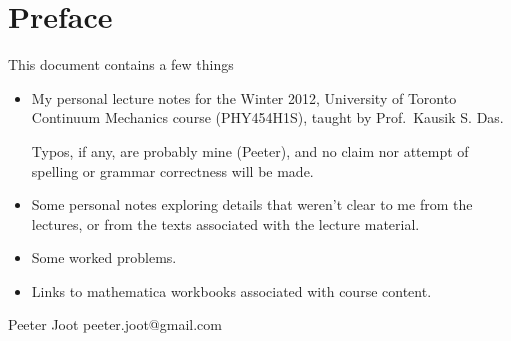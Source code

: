 \chapter*{Preface}\normalsize

This document contains a few things

\begin{itemize}
\item My personal lecture notes for the Winter 2012, University of Toronto Continuum Mechanics course (PHY454H1S), taught by Prof.\ Kausik S. Das.

Typos, if any, are probably mine (Peeter), and no claim nor attempt of spelling or grammar correctness will be made.

\item Some personal notes exploring details that weren't clear to me from the lectures, or from the texts associated with the lecture material.

\item Some worked problems.

\item Links to mathematica workbooks associated with course content.

\end{itemize}

Peeter Joot  \quad peeter.joot@gmail.com 

